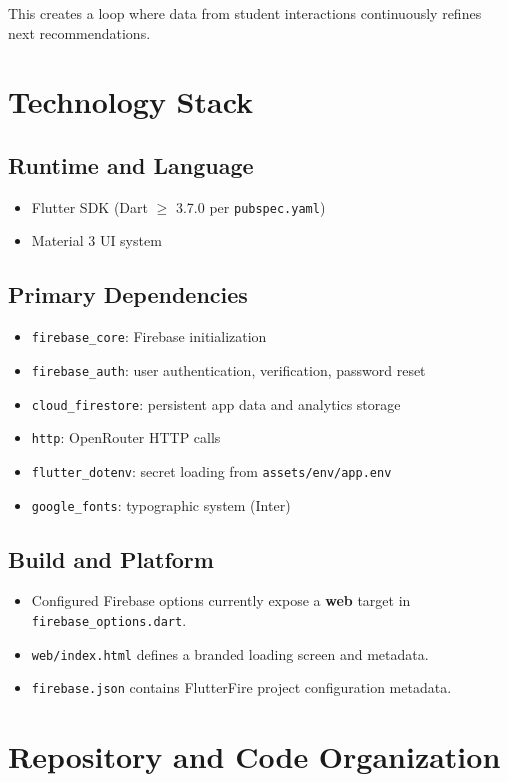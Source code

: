 \documentclass[11pt,a4paper]{article}
\begin{document}
This creates a loop where data from student interactions continuously refines next recommendations.

\section{Technology Stack}
\subsection{Runtime and Language}
\begin{itemize}
  \item Flutter SDK (Dart $\geq$ 3.7.0 per \texttt{pubspec.yaml})
  \item Material 3 UI system
\end{itemize}

\subsection{Primary Dependencies}
\begin{itemize}
  \item \texttt{firebase\_core}: Firebase initialization
  \item \texttt{firebase\_auth}: user authentication, verification, password reset
  \item \texttt{cloud\_firestore}: persistent app data and analytics storage
  \item \texttt{http}: OpenRouter HTTP calls
  \item \texttt{flutter\_dotenv}: secret loading from \texttt{assets/env/app.env}
  \item \texttt{google\_fonts}: typographic system (Inter)
\end{itemize}

\subsection{Build and Platform}
\begin{itemize}
  \item Configured Firebase options currently expose a \textbf{web} target in \texttt{firebase\_options.dart}.
  \item \texttt{web/index.html} defines a branded loading screen and metadata.
  \item \texttt{firebase.json} contains FlutterFire project configuration metadata.
\end{itemize}

\section{Repository and Code Organization}
\end{document}
